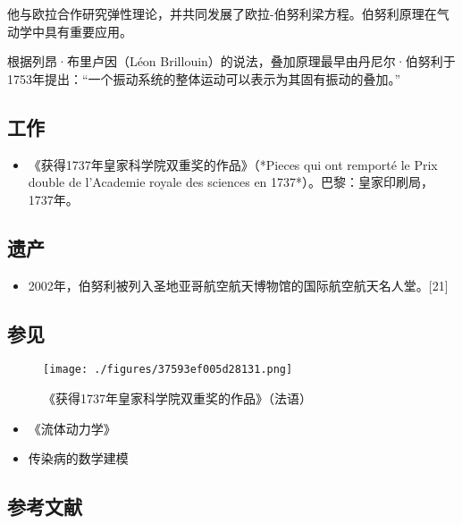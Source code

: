 他与欧拉合作研究弹性理论，并共同发展了欧拉-伯努利梁方程。伯努利原理在气动学中具有重要应用。

根据列昂·布里卢因（Léon Brillouin）的说法，叠加原理最早由丹尼尔·伯努利于1753年提出：“一个振动系统的整体运动可以表示为其固有振动的叠加。”
\subsection{工作}
\begin{itemize}
\item 《获得1737年皇家科学院双重奖的作品》（*Pieces qui ont remporté le Prix double de l'Academie royale des sciences en 1737*）。巴黎：皇家印刷局，1737年。
\end{itemize}
\subsection{遗产}
\begin{itemize}
\item 2002年，伯努利被列入圣地亚哥航空航天博物馆的国际航空航天名人堂。[21]
\end{itemize}
\subsection{参见}
\begin{figure}[ht]
\centering
\texttt{[image: ./figures/37593ef005d28131.png]}
\caption{《获得1737年皇家科学院双重奖的作品》（法语）} \label{fig_BNL_6}
\end{figure}
\begin{itemize}
\item 《流体动力学》  
\item 传染病的数学建模
\end{itemize}
\subsection{参考文献}  
